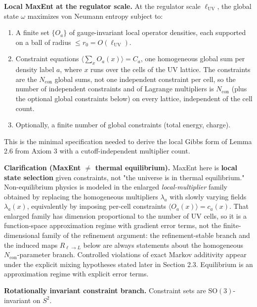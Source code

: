 \textbf{Local MaxEnt at the regulator scale.} At the regulator scale \(\ell_{\mathrm{UV}}\), the global state \(\omega\) maximizes von Neumann entropy subject to:

\begin{enumerate}
\def\labelenumi{\arabic{enumi}.}
\tightlist
\item
  A finite set \(\{O_a\}\) of gauge-invariant local operator densities, each supported on a ball of radius \(\le r_0 = O(\ell_{\mathrm{UV}})\).
\item
  Constraint equations \(\bigl\langle \sum_x O_a(x) \bigr\rangle = C_a\), one homogeneous global sum per density label \(a\), where \(x\) runs over the cells of the UV lattice. The constraints are the \(N_{\mathrm{con}}\) global sums, not one independent constraint per cell, so the number of independent constraints and of Lagrange multipliers is \(N_{\mathrm{con}}\) (plus the optional global constraints below) on every lattice, independent of the cell count.
\item
  Optionally, a finite number of global constraints (total energy, charge).
\end{enumerate}

This is the minimal specification needed to derive the local Gibbs form of Lemma 2.6 from Axiom 3 with a cutoff-independent multiplier count.

\textbf{Clarification (MaxEnt \(\neq\) thermal equilibrium).} MaxEnt here is \textbf{local state selection} given constraints, not "the universe is in thermal equilibrium." Non-equilibrium physics is modeled in the enlarged \emph{local-multiplier} family obtained by replacing the homogeneous multipliers \(\lambda_a\) with slowly varying fields \(\lambda_a(x)\), equivalently by imposing per-cell constraints \(\langle O_a(x)\rangle = c_a(x)\). That enlarged family has dimension proportional to the number of UV cells, so it is a function-space approximation regime with gradient error terms, not the finite-dimensional family of the refinement argument: the refinement-stable branch and the induced maps \(R_{\ell\to L}\) below are always statements about the homogeneous \(N_{\mathrm{con}}\)-parameter branch. Controlled violations of exact Markov additivity appear under the explicit mixing hypotheses stated later in Section 2.3. Equilibrium is an approximation regime with explicit error terms.

\textbf{Rotationally invariant constraint branch.} Constraint sets are \(\mathrm{SO}(3)\)-invariant on \(S^2\).

